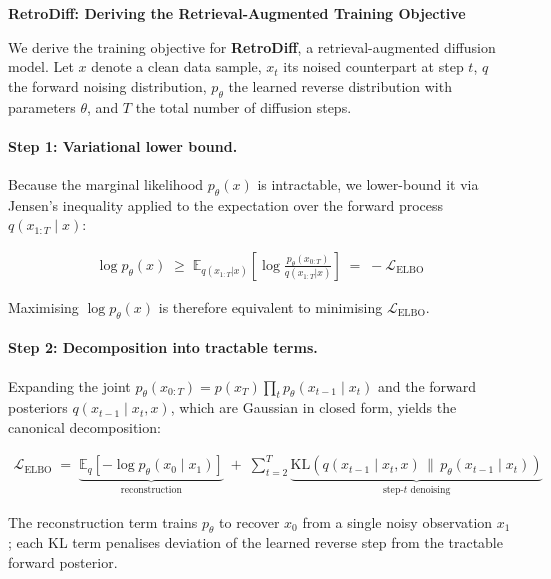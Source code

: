 \documentclass[11pt]{article}
\begin{document}
\begin{center}
  {\large\bfseries RetroDiff: Deriving the Retrieval-Augmented Training Objective}
\end{center}

\medskip

We derive the training objective for \textbf{RetroDiff}, a retrieval-augmented diffusion
model. Let $x$ denote a clean data sample, $x_t$ its noised counterpart at step $t$,
$q$ the forward noising distribution, $p_\theta$ the learned reverse distribution with
parameters $\theta$, and $T$ the total number of diffusion steps.

\paragraph{Step 1: Variational lower bound.}
Because the marginal likelihood $p_\theta(x)$ is intractable, we lower-bound it via
Jensen's inequality applied to the expectation over the forward process
$q(x_{1:T}\mid x)$:

\begin{align}
  \log p_\theta(x)
  \;\geq\;
  \mathbb{E}_{q(x_{1:T}|x)}\!\left[\log\frac{p_\theta(x_{0:T})}{q(x_{1:T}|x)}\right]
  \;=\;
  -\mathcal{L}_{\mathrm{ELBO}}
  \label{eq:elbo}
\end{align}

Maximising $\log p_\theta(x)$ is therefore equivalent to minimising
$\mathcal{L}_{\mathrm{ELBO}}$.

\paragraph{Step 2: Decomposition into tractable terms.}
Expanding the joint $p_\theta(x_{0:T})=p(x_T)\prod_t p_\theta(x_{t-1}\mid x_t)$
and the forward posteriors $q(x_{t-1}\mid x_t,x)$, which are Gaussian in closed form,
yields the canonical decomposition:

\begin{align}
  \mathcal{L}_{\mathrm{ELBO}}
  \;=\;
  \underbrace{\mathbb{E}_q\!\left[-\log p_\theta(x_0\mid x_1)\right]}_{\text{reconstruction}}
  \;+\;
  \sum_{t=2}^{T}
  \underbrace{
    \mathrm{KL}\!\left(q(x_{t-1}\mid x_t,x)\,\|\,p_\theta(x_{t-1}\mid x_t)\right)
  }_{\text{step-}t\text{ denoising}}
  \label{eq:decomp}
\end{align}

The reconstruction term trains $p_\theta$ to recover $x_0$ from a single noisy
observation $x_1$; each KL term penalises deviation of the learned reverse step from
the tractable forward posterior.
\end{document}
